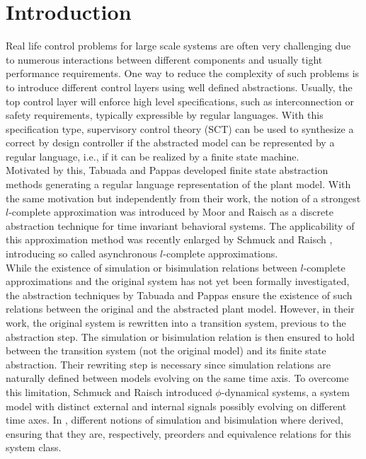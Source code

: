 \documentclass[letterpaper, 11 pt, onecolumn]{ieeeconf}
\newcommand{\0}{\ensuremath{\emptyset}}
\newcommand{\signalmap}{\phi}
\begin{document}
\section{Introduction}
Real life control problems for large scale systems are often very challenging due to numerous interactions between different components and usually tight performance requirements. One way to reduce the complexity of such problems is to introduce different control layers using well defined abstractions. Usually, the top control layer will enforce high level specifications, such as interconnection or safety requirements, typically expressible by regular languages. 
With this specification type, supervisory control theory (SCT) \cite{RamWon1984} can be used to synthesize a correct by design controller if the abstracted model can be represented by a regular language, i.e., if it can be realized by a finite state machine.\\
Motivated by this, Tabuada and Pappas \cite{TabuadaPappas2003b,TabuadaPappas2003,TabuadaBook} developed finite state abstraction methods 
generating a regular language representation of the plant model.
With the same motivation but independently from their work, the notion of a strongest $l$-complete approximation was introduced by Moor and Raisch \cite{MoorRaisch1999, MoorRaischYoung2002}  as a discrete abstraction technique for time invariant behavioral systems. The applicability of this approximation method was recently enlarged by Schmuck and Raisch \cite{SchmuckRaisch2014_ControlLetters}, introducing so called asynchronous $l$-complete approximations.\\
While the existence of simulation or bisimulation relations between $l$-complete approximations and the original system has not yet been formally investigated, the abstraction techniques by Tabuada and Pappas ensure the existence of such relations between the original and the abstracted plant model. However, in their work, 
the original system is rewritten into a transition system, previous to the abstraction step. The simulation or bisimulation relation is then ensured to hold between the transition system (not the original model) and its finite state abstraction.
Their rewriting step is necessary since simulation relations are naturally defined between models evolving on the same time axis. To overcome this limitation, Schmuck and Raisch \cite{SchmuckRaisch2014_HSCC} introduced $\signalmap$-dynamical systems, a system model with distinct external and internal signals possibly evolving on different time axes. In \cite{SchmuckRaisch2014_HSCC}, different notions of simulation and bisimulation where derived, ensuring that they are, respectively, preorders and equivalence relations for this system class.\\
\end{document}
